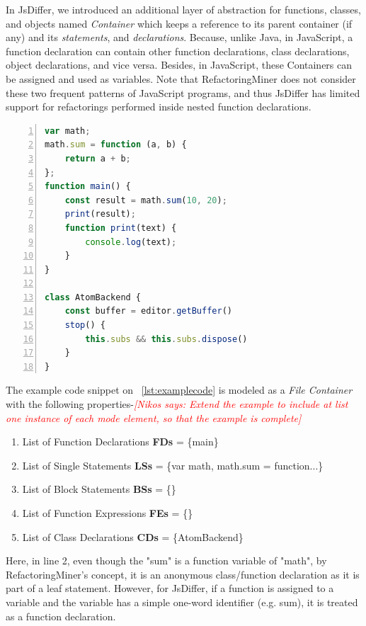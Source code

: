 \documentclass[letterpaper,12pt,onecolumn,final]{report}
\newcommand{\nikos}[1]{\textcolor{red}{{\it [Nikos says: #1]}}}
\begin{document}
In JsDiffer, we introduced an additional layer of abstraction for functions, classes, and objects named \textit{Container} which keeps a reference to its parent container (if any) and its \textit{statements}, and \textit{declarations}. Because, unlike Java, in JavaScript, a function declaration can contain other function declarations, class declarations, object declarations, and vice versa. Besides, in JavaScript, these Containers can be assigned and used as variables. Note that RefactoringMiner does not consider these two frequent patterns of JavaScript programs, and thus JsDiffer has limited support for refactorings performed inside nested function declarations.



\begin{lstlisting}[language=JavaScript, caption=Example JavaScript Code Snippet, numbers=left, label={lst:examplecode}]
var math;
math.sum = function (a, b) {
    return a + b;
};
function main() {
    const result = math.sum(10, 20);
    print(result);
    function print(text) {
        console.log(text);
    }
}

class AtomBackend {
    const buffer = editor.getBuffer()
    stop() {
        this.subs && this.subs.dispose()
    }
}
\end{lstlisting}

The example code snippet on ~\ref{lst:examplecode} is modeled as a \textit{File Container} with the following properties-\nikos{Extend the example to include at list one instance of each mode element, so that the example is complete}

\begin{enumerate}
\item List of Function Declarations \textbf{FDs} = \{main\}
\item List of Single Statements \textbf{LSs} = \{var math, math.sum = function...\}
\item List of Block Statements \textbf{BSs} = \{\}
\item List of Function Expressions \textbf{FEs} = \{\}
\item List of Class Declarations \textbf{CDs} = \{AtomBackend\}
\end{enumerate}

Here, in line 2, even though the "sum" is a function variable of "math", by RefactoringMiner's concept, it is an anonymous class/function declaration as it is part of a leaf statement. However, for JsDiffer, if a function is assigned to a variable and the variable has a simple one-word identifier (e.g. sum), it is treated as a function declaration.
\end{document}
